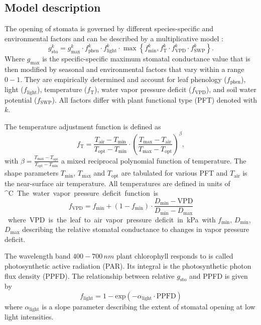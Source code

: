 \documentclass[bg, manuscript]{copernicus}
\begin{document}
\subsection{Model description}
\label{subsec:model_describtion}
The opening of stomata is governed by different species-specific and environmental factors and can be described by a multiplicative model \citep{PTRS:Jarvis1976,Emberson2000,ICP:MappingManual2017}:
\begin{equation}
  g^k_\text{sto} = g^k_\text{max} \cdot f^k_\text{phen} \cdot f^k_\text{light} \cdot \max{\left\{f^k_\text{min}, f^k_\mathrm{T} \cdot f^k_\mathrm{VPD} \cdot f^k_\text{SWP}\right\}}.
  \label{eq:stomatal}
\end{equation}
%
Where $g_\mathrm{max}$ is the specific-specific maximum stomatal conductance value that is then modified by seasonal and environmental factors that vary within a range $0-1$. They are empirically determined and account for leaf phenology ($f_\text{phen}$), light ($f_\text{light}$), temperature ($f_\mathrm{T}$), water vapor pressure deficit ($f_\mathrm{VPD}$), and soil water potential ($f_\text{SWP}$). All factors differ with plant functional type (PFT) denoted with $k$.

The temperature adjustment function is defined as
%
\begin{equation}
  f_\mathrm{T} = \frac{T_\text{air}-T_\text{min}}{T_\text{opt}-T_\text{min}} \cdot \left(\frac{T_{\text{max}}-T_\text{air}}{T_{\text{max}}-T_\text{opt}}\right)^\beta,
  \label{eq:f_temp}
\end{equation}
with $\beta = \frac{T_\text{max}-T_\text{opt}}{T_\text{opt}-T_\text{min}}$ a mixed reciprocal polynomial function of temperature. The shape parameters $T_\text{min}$, $T_\text{max}$ and $T_\text{opt}$ are tabulated for various PFT and $T_\mathrm{air}$ is the near-surface air temperature. All temperatures are defined in units of \unit{^\circ C}.

The water vapor pressure deficit function is
%
\begin{equation}
  f_\mathrm{VPD} = f_\text{min}+(1-f_\text{min}) \cdot \frac{D_\text{min} - \text{VPD}}{D_\text{min}-D_\text{max}}
  \label{eq:f_vpd}
\end{equation}
%
where VPD is the leaf to air vapor pressure deficit in \unit{kPa} with $f_\text{min}$, $D_\text{min}$, $D_\text{max}$ describing the relative stomatal conductance to changes in vapor pressure deficit.

The wavelength band $400-700\,\unit{nm}$ plant chlorophyll responds to is called photosynthetic active radiation (PAR). Its integral is the photosynthetic photon flux density (PPFD). The relationship between relative $g_\mathrm{sto}$ and PPFD is given by
%
\begin{equation}
  f_\text{light} = 1-\text{exp}(-\alpha_\text{light}\cdot \text{PPFD})
  \label{eq:flight}
\end{equation}
%
where $\alpha_\mathrm{light}$ is a slope parameter describing the extent of stomatal opening at low light intensities.
\end{document}
